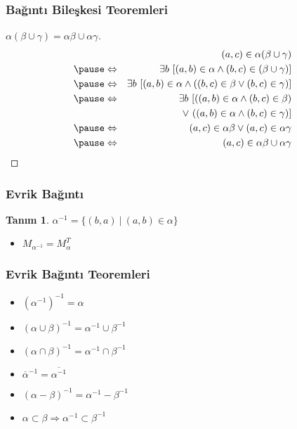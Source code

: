 \documentclass[dvipsnames]{beamer}
\theoremstyle{definition}
\newtheorem{tanim}[theorem]{Tanım}
\theoremstyle{example}
\theoremstyle{plain}
\begin{document}
\begin{frame}
  \frametitle{Bağıntı Bileşkesi Teoremleri}

  \begin{proof}[$\alpha (\beta \cup \gamma) = \alpha \beta \cup \alpha \gamma$]
    \begin{eqnarray*}
      &                 & (a,c) \in \alpha (\beta \cup \gamma)\\\pause
      & \Leftrightarrow & \exists b~[(a,b) \in \alpha
                              \wedge (b,c) \in (\beta \cup \gamma)]\\\pause
      & \Leftrightarrow & \exists b~[(a,b) \in \alpha
                             \wedge ((b,c) \in \beta
                                \vee (b,c) \in \gamma)]\\\pause
      & \Leftrightarrow & \exists b~[((a,b) \in \alpha \wedge (b,c) \in \beta)\\
      &                 &     ~~\vee~((a,b) \in \alpha \wedge (b,c) \in \gamma)]\\\pause
      & \Leftrightarrow & (a,c) \in \alpha \beta \vee (a,c) \in \alpha \gamma\\\pause
      & \Leftrightarrow & (a,c) \in \alpha \beta \cup \alpha \gamma
    \end{eqnarray*}
  \end{proof}
\end{frame}

\begin{frame}
  \frametitle{Evrik Bağıntı}

  \begin{tanim}
    $\alpha^{-1} = \{(b,a)~|~(a,b) \in \alpha \}$
  \end{tanim}

  \begin{itemize}
    \item $M_{\alpha^{-1}} = M_{\alpha}^T$
  \end{itemize}
\end{frame}

\begin{frame}
  \frametitle{Evrik Bağıntı Teoremleri}

  \begin{itemize}
    \item $(\alpha^{-1})^{-1} = \alpha$
    \item $(\alpha \cup \beta)^{-1} = \alpha^{-1} \cup \beta^{-1}$
    \item $(\alpha \cap \beta)^{-1} = \alpha^{-1} \cap \beta^{-1}$
    \item $\overline{\alpha}^{-1} = \overline{\alpha^{-1}}$
    \item $(\alpha - \beta)^{-1} = \alpha^{-1} - \beta^{-1}$
    \item $\alpha \subset \beta \Rightarrow \alpha^{-1} \subset \beta^{-1}$
  \end{itemize}
\end{frame}
\end{document}
